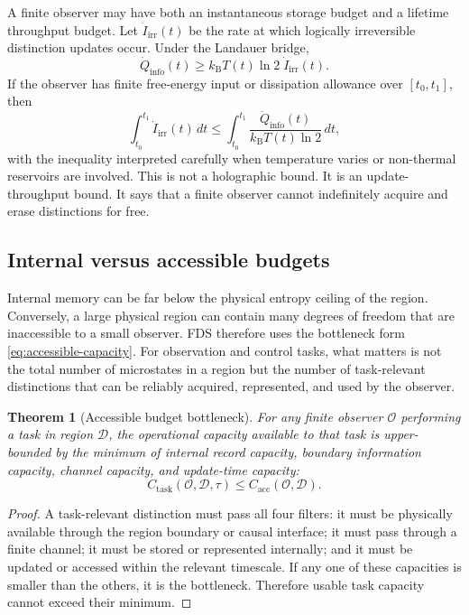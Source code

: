 \documentclass[10pt,a4paper,twocolumn,aps,prl]{revtex4-2}
\newtheorem{theorem}{Theorem}
\newcommand{\Obs}{\mathcal{O}}
\newcommand{\Patch}{\mathcal{D}}
\newcommand{\kB}{k_{\mathrm B}}
\begin{document}
A finite observer may have both an instantaneous storage budget and a lifetime throughput budget. Let $\dot I_{\mathrm{irr}}(t)$ be the rate at which logically irreversible distinction updates occur. Under the Landauer bridge,
\begin{equation}
\dot Q_{\mathrm{info}}(t)\geq \kB T(t)\ln2\;\dot I_{\mathrm{irr}}(t).
\label{eq:landauer-rate}
\end{equation}
If the observer has finite free-energy input or dissipation allowance over $[t_0,t_1]$, then
\begin{equation}
\int_{t_0}^{t_1}\dot I_{\mathrm{irr}}(t)\,dt
\leq
\int_{t_0}^{t_1}\frac{\dot Q_{\mathrm{info}}(t)}{\kB T(t)\ln2}\,dt,
\end{equation}
with the inequality interpreted carefully when temperature varies or non-thermal reservoirs are involved. This is not a holographic bound. It is an update-throughput bound. It says that a finite observer cannot indefinitely acquire and erase distinctions for free.

\subsection{Internal versus accessible budgets}

Internal memory can be far below the physical entropy ceiling of the region. Conversely, a large physical region can contain many degrees of freedom that are inaccessible to a small observer. FDS therefore uses the bottleneck form \eqref{eq:accessible-capacity}. For observation and control tasks, what matters is not the total number of microstates in a region but the number of task-relevant distinctions that can be reliably acquired, represented, and used by the observer.

\begin{theorem}[Accessible budget bottleneck]
For any finite observer $\Obs$ performing a task in region $\Patch$, the operational capacity available to that task is upper-bounded by the minimum of internal record capacity, boundary information capacity, channel capacity, and update-time capacity:
\begin{equation}
C_{\mathrm{task}}(\Obs,\Patch,\tau)\leq C_{\mathrm{acc}}(\Obs,\Patch).
\end{equation}
\end{theorem}

\begin{proof}
A task-relevant distinction must pass all four filters: it must be physically available through the region boundary or causal interface; it must pass through a finite channel; it must be stored or represented internally; and it must be updated or accessed within the relevant timescale. If any one of these capacities is smaller than the others, it is the bottleneck. Therefore usable task capacity cannot exceed their minimum.
\end{proof}
\end{document}
